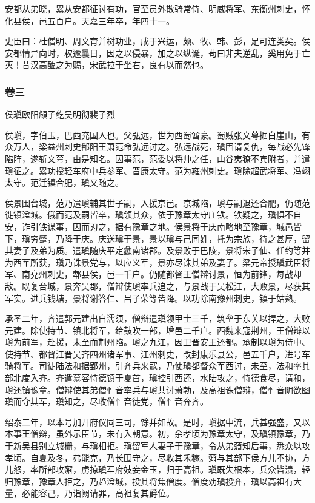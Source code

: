 \documentclass[]{article}
\begin{document}
安都从弟晓，累从安都征讨有功，官至员外散骑常侍、明威将军、东衡州刺史，怀化县侯，邑五百户。天嘉三年卒，年四十一。

史臣曰：杜僧明、周文育并树功业，成于兴运，颇、牧、韩、彭，足可连类矣。侯安都情异向时，权逾曩日，因之以侵暴，加之以纵诞，苟曰非夫逆乱，奚用免于亡灭！昔汉高醢之为赐，宋武拉于坐右，良有以而然也。

\hypertarget{header-n4332}{%
\subsubsection{卷三}\label{header-n4332}}

侯瑱欧阳頠子纥吴明彻裴子烈

侯瑱，字伯玉，巴西充国人也。父弘远，世为西蜀酋豪。蜀贼张文萼据白崖山，有众万人，梁益州刺史鄱阳王萧范命弘远讨之。弘远战死，瑱固请复仇，每战必先锋陷阵，遂斩文萼，由是知名。因事范，范委以将帅之任，山谷夷獠不宾附者，并遣瑱征之。累功授轻车府中兵参军、晋康太守。范为雍州刺史。瑱除超武将军、冯翊太守。范迁镇合肥，瑱又随之。

侯景围台城，范乃遣瑱辅其世子嗣，入援京邑。京城陷，瑱与嗣退还合肥，仍随范徙镇湓城。俄而范及嗣皆卒，瑱领其众，依于豫章太守庄铁。铁疑之，瑱惧不自安，诈引铁谋事，因而刃之，据有豫章之地。侯景将于庆南略地至豫章，城邑皆下，瑱穷蹙，乃降于庆。庆送瑱于景，景以瑱与己同姓，托为宗族，待之甚厚，留其妻子及弟为质。遣瑱随庆平定蠡南诸郡。及景败于巴陵，景将宋子仙、任约等并为西军所获，瑱乃诛景党与，以应义军，景亦尽诛其弟及妻子。梁元帝授瑱武臣将军、南兗州刺史，郫县侯，邑一千户。仍随都督王僧辩讨景，恒为前锋，每战却敌。既复台城，景奔吴郡，僧辩使瑱率兵追之，与景战于吴松江，大败景，尽获其军实。进兵钱塘，景将谢答仁、吕子荣等皆降。以功除南豫州刺史，镇于姑熟。

承圣二年，齐遣郭元建出自濡须，僧辩遣瑱领甲士三千，筑垒于东关以捍之，大败元建。除使持节、镇北将军，给鼓吹一部，增邑二千户。西魏来寇荆州，王僧辩以瑱为前军，赴援，未至而荆州陷。瑱之九江，因卫晋安王还都。承制以瑱为侍中、使持节、都督江晋吴齐四州诸军事、江州刺史，改封康乐县公，邑五千户，进号车骑将军。司徒陆法和据郢州，引齐兵来寇，乃使瑱都督众军西讨，未至，法和率其部北度入齐。齐遣慕容恃德镇于夏首，瑱控引西还，水陆攻之，恃德食尽，请和，瑱还镇豫章。僧辩使其弟僧忄音率兵与瑱共讨萧勃，及高祖诛僧辩，僧忄音阴欲图瑱而夺其军，瑱知之，尽收僧忄音徒党，僧忄音奔齐。

绍泰二年，以本号加开府仪同三司，馀并如故。是时，瑱据中流，兵甚强盛，又以本事王僧辩，虽外示臣节，未有入朝意。初，余孝顷为豫章太守，及瑱镇豫章，乃于新吴县别立城栅，与瑱相拒。瑱留军人妻子于豫章，令从弟奫知后事，悉众以攻孝顷。自夏及冬，弗能克，乃长围守之，尽收其禾稼。奫与其部下侯方儿不协，方儿怒，率所部攻奫，虏掠瑱军府妓妾金玉，归于高祖。瑱既失根本，兵众皆溃，轻归豫章，豫章人拒之，乃趋湓城，投其将焦僧度。僧度劝瑱投齐，瑱以高祖有大量，必能容己，乃诣阙请罪，高祖复其爵位。
\end{document}
